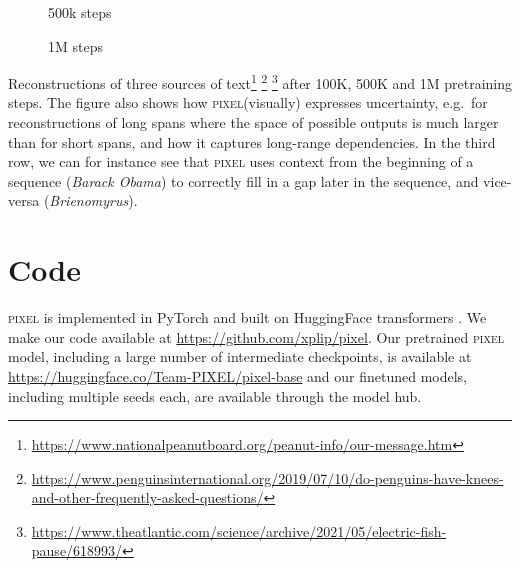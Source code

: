 \documentclass{article}
\newcommand{\model}{\textsc{pixel}\xspace}
\begin{document}
\begin{figure*}[ht!]
\begin{subfigure}[]{0.32\textwidth}
        \centering
        {\setlength{\fboxsep}{0pt}\setlength{\fboxrule}{1pt}}\caption{500k steps}
    \end{subfigure}\hfill
    \begin{subfigure}[]{0.32\textwidth}
        \centering
        {\setlength{\fboxsep}{0pt}\setlength{\fboxrule}{1pt}}\caption{1M steps}
    \end{subfigure}
    \caption{\model image reconstructions after 100k, 500k, and 1M steps of pretraining. We overlay the masked original image with the model's predictions. Images are wrapped into squares and resized for visualization purposes only. The texts were not part of the training data. We see that the fully trained \model (1M) predicts masked spans more clearly and accurately. For longer spans with a larger possible prediction space, multiple predictions may appear together creating blurred text.}
    \label{fig:pretraining_dynamics}
\end{figure*}

Reconstructions of three sources of text\footnote{\url{https://www.nationalpeanutboard.org/peanut-info/our-message.htm}} \footnote{\url{https://www.penguinsinternational.org/2019/07/10/do-penguins-have-knees-and-other-frequently-asked-questions/}} \footnote{\url{https://www.theatlantic.com/science/archive/2021/05/electric-fish-pause/618993/}} after 100K, 500K and 1M pretraining steps. The figure also shows how \model (visually) expresses uncertainty, e.g.\ for reconstructions of long spans where the space of possible outputs is much larger than for short spans, and how it captures long-range dependencies. In the third row, we can for instance see that \model uses context from the beginning of a sequence (\emph{Barack Obama}) to correctly fill in a gap later in the sequence, and vice-versa (\emph{Brienomyrus}).
\section{Code}
\label{app:implementation}

\model is implemented in PyTorch \citep{DBLP:conf/nips/PaszkeGMLBCKLGA19} and built on HuggingFace transformers \citep{wolf-etal-2020-transformers}. We make our code available at \url{https://github.com/xplip/pixel}. Our pretrained \model model, including a large number of intermediate checkpoints, is available at \url{https://huggingface.co/Team-PIXEL/pixel-base} and our finetuned models, including multiple seeds each, are available through the model hub.
\end{document}

